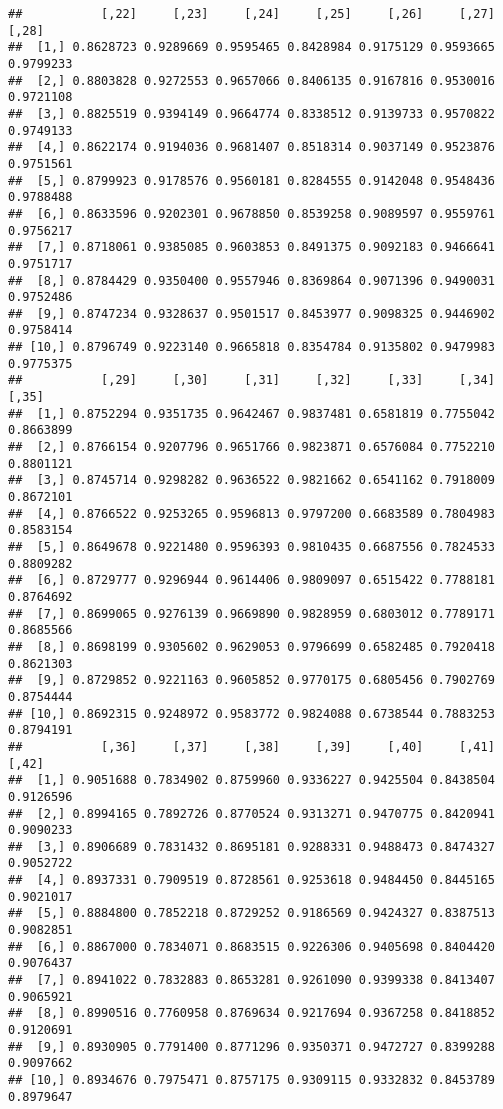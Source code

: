 \documentclass[
]{article}
\begin{document}
\begin{verbatim}
##           [,22]     [,23]     [,24]     [,25]     [,26]     [,27]     [,28]
##  [1,] 0.8628723 0.9289669 0.9595465 0.8428984 0.9175129 0.9593665 0.9799233
##  [2,] 0.8803828 0.9272553 0.9657066 0.8406135 0.9167816 0.9530016 0.9721108
##  [3,] 0.8825519 0.9394149 0.9664774 0.8338512 0.9139733 0.9570822 0.9749133
##  [4,] 0.8622174 0.9194036 0.9681407 0.8518314 0.9037149 0.9523876 0.9751561
##  [5,] 0.8799923 0.9178576 0.9560181 0.8284555 0.9142048 0.9548436 0.9788488
##  [6,] 0.8633596 0.9202301 0.9678850 0.8539258 0.9089597 0.9559761 0.9756217
##  [7,] 0.8718061 0.9385085 0.9603853 0.8491375 0.9092183 0.9466641 0.9751717
##  [8,] 0.8784429 0.9350400 0.9557946 0.8369864 0.9071396 0.9490031 0.9752486
##  [9,] 0.8747234 0.9328637 0.9501517 0.8453977 0.9098325 0.9446902 0.9758414
## [10,] 0.8796749 0.9223140 0.9665818 0.8354784 0.9135802 0.9479983 0.9775375
##           [,29]     [,30]     [,31]     [,32]     [,33]     [,34]     [,35]
##  [1,] 0.8752294 0.9351735 0.9642467 0.9837481 0.6581819 0.7755042 0.8663899
##  [2,] 0.8766154 0.9207796 0.9651766 0.9823871 0.6576084 0.7752210 0.8801121
##  [3,] 0.8745714 0.9298282 0.9636522 0.9821662 0.6541162 0.7918009 0.8672101
##  [4,] 0.8766522 0.9253265 0.9596813 0.9797200 0.6683589 0.7804983 0.8583154
##  [5,] 0.8649678 0.9221480 0.9596393 0.9810435 0.6687556 0.7824533 0.8809282
##  [6,] 0.8729777 0.9296944 0.9614406 0.9809097 0.6515422 0.7788181 0.8764692
##  [7,] 0.8699065 0.9276139 0.9669890 0.9828959 0.6803012 0.7789171 0.8685566
##  [8,] 0.8698199 0.9305602 0.9629053 0.9796699 0.6582485 0.7920418 0.8621303
##  [9,] 0.8729852 0.9221163 0.9605852 0.9770175 0.6805456 0.7902769 0.8754444
## [10,] 0.8692315 0.9248972 0.9583772 0.9824088 0.6738544 0.7883253 0.8794191
##           [,36]     [,37]     [,38]     [,39]     [,40]     [,41]     [,42]
##  [1,] 0.9051688 0.7834902 0.8759960 0.9336227 0.9425504 0.8438504 0.9126596
##  [2,] 0.8994165 0.7892726 0.8770524 0.9313271 0.9470775 0.8420941 0.9090233
##  [3,] 0.8906689 0.7831432 0.8695181 0.9288331 0.9488473 0.8474327 0.9052722
##  [4,] 0.8937331 0.7909519 0.8728561 0.9253618 0.9484450 0.8445165 0.9021017
##  [5,] 0.8884800 0.7852218 0.8729252 0.9186569 0.9424327 0.8387513 0.9082851
##  [6,] 0.8867000 0.7834071 0.8683515 0.9226306 0.9405698 0.8404420 0.9076437
##  [7,] 0.8941022 0.7832883 0.8653281 0.9261090 0.9399338 0.8413407 0.9065921
##  [8,] 0.8990516 0.7760958 0.8769634 0.9217694 0.9367258 0.8418852 0.9120691
##  [9,] 0.8930905 0.7791400 0.8771296 0.9350371 0.9472727 0.8399288 0.9097662
## [10,] 0.8934676 0.7975471 0.8757175 0.9309115 0.9332832 0.8453789 0.8979647

\end{verbatim}
\end{document}
